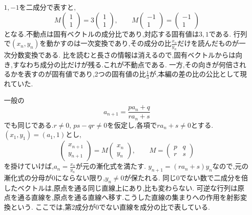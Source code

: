 $1,-1$を二成分で表すと,
\[
  M\begin{pmatrix}1\\1\end{pmatrix}
  =3\begin{pmatrix}1\\1\end{pmatrix},
  \qquad
  M\begin{pmatrix}-1\\1\end{pmatrix}
  =\begin{pmatrix}-1\\1\end{pmatrix}
\]
となる.不動点は固有ベクトルの成分比であり,対応する固有値は$3,1$である.
行列で$(x_n,y_n)$を動かすのは一次変換であり,その成分の比$\frac{x_n}{y_n}$だけを読んだものが一次分数変換である.
比を読むと長さの情報は消えるので,固有ベクトルからは向き,すなわち成分の比だけが残る.これが不動点である.
一方,その向きが何倍されるかを表すのが固有値であり,2つの固有値の比$\frac13$が,本編の差の比の公比として現れていた.

一般の
\[
  a_{n+1}=\frac{pa_n+q}{ra_n+s}
\]
でも同じである.$r\ne0$, $ps-qr\ne0$を仮定し,各項で$ra_n+s\ne0$とする.
$(x_1,y_1)=(a_1,1)$とし,
\[
  \begin{pmatrix}x_{n+1}\\y_{n+1}\end{pmatrix}
  =M\begin{pmatrix}x_n\\y_n\end{pmatrix},
  \qquad
  M=\begin{pmatrix}p&q\\r&s\end{pmatrix}
\]
を掛けていけば,$a_n=\frac{x_n}{y_n}$が元の漸化式を満たす.
$y_{n+1}=(ra_n+s)y_n$なので,元の漸化式の分母が0にならない限り,$y_n\ne0$が保たれる.
同じ0でない数で二成分を倍したベクトルは,原点を通る同じ直線上にあり,比も変わらない.
可逆な行列は原点を通る直線を,原点を通る直線へ移す.こうした直線の集まりへの作用を射影変換という.
ここでは,第2成分が0でない直線を成分の比で表している.

